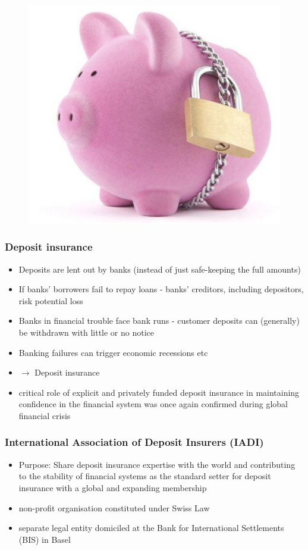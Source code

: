 \documentclass[11pt]{beamer}
\begin{document}
\begin{frame}
\begin{figure}
\includegraphics[width=\textwidth]{DepIns.png}
\end{figure}
\end{frame}


\begin{frame}
\frametitle{Deposit insurance}
\begin{itemize}
\item Deposits are lent out by banks (instead of just safe-keeping the full amounts)
\item If banks' borrowers fail to repay loans - banks' creditors, including depositors, risk potential loss
\item Banks in financial trouble face bank runs - customer deposits can (generally) be withdrawn with little or no notice
\item Banking failures can trigger economic recessions etc
\item $\rightarrow$ Deposit insurance
\item critical role of explicit and privately funded deposit insurance in maintaining confidence in the financial system was once again confirmed during global financial crisis
\end{itemize}
\end{frame}

\begin{frame}
\frametitle{International Association of Deposit Insurers (IADI)}
\begin{itemize}
\item Purpose: Share deposit insurance expertise with the world and contributing to the stability of financial systems as the standard setter for deposit insurance with a global and expanding membership
\item non-profit organisation constituted under Swiss Law
\item separate legal entity domiciled at the Bank for International Settlements (BIS) in Basel
\end{itemize}
\end{frame}
\end{document}
